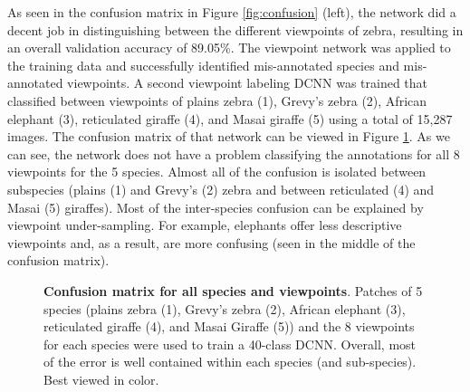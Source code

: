 As seen in the confusion matrix in Figure \ref{fig:confusion} (left), the network did a decent job in distinguishing between the different viewpoints of zebra, resulting in an overall validation accuracy of 89.05\%.  The viewpoint network was applied to the training data and successfully identified mis-annotated species and mis-annotated viewpoints.  A second viewpoint labeling DCNN was trained that classified between viewpoints of plains zebra (1), Grevy's zebra (2), African elephant (3), reticulated giraffe (4), and Masai giraffe (5) using a total of 15,287 images.  The confusion matrix of that network can be viewed in Figure \ref{fig:viewpoint-all}.  As we can see, the network does not have a problem classifying the annotations for all 8 viewpoints for the 5 species.  Almost all of the confusion is isolated between subspecies (plains (1) and Grevy's (2) zebra and between reticulated (4) and Masai (5) giraffes).  Most of the inter-species confusion can be explained by viewpoint under-sampling.  For example, elephants offer less descriptive viewpoints and, as a result, are more confusing (seen in the middle of the confusion matrix).

\begin{figure}[t]%
	\centering
    	\caption[Confusion Matrix for All Species and Viewpoints]{\textbf{Confusion matrix for all species and viewpoints}.  Patches of 5 species (plains zebra (1), Grevy's zebra (2), African elephant (3), reticulated giraffe (4), and Masai Giraffe (5)) and the 8 viewpoints for each species were used to train a 40-class DCNN.  Overall, most of the error is well contained within each species (and sub-species).  Best viewed in color.}
    	\label{fig:viewpoint-all}
\end{figure}

